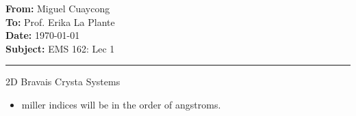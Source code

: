 \documentclass[11pt]{article}
\newcommand{\memoheader}[4]{
  \noindent
  \textbf{From:} #2\\ 
  \textbf{To:} #1\\
  \textbf{Date:} #3\\
  \textbf{Subject:} #4\\[1ex]\hrule\vspace{1.5ex}
}
\begin{document}
\memoheader{Prof. Erika La Plante}
            {Miguel Cuaycong}
            {\today}
            {EMS 162: Lec 1}
\noindent 2D Bravais Crysta Systems
\begin{itemize}
    \item miller indices will be in the order of angstroms.
\end{itemize}
\end{document}
